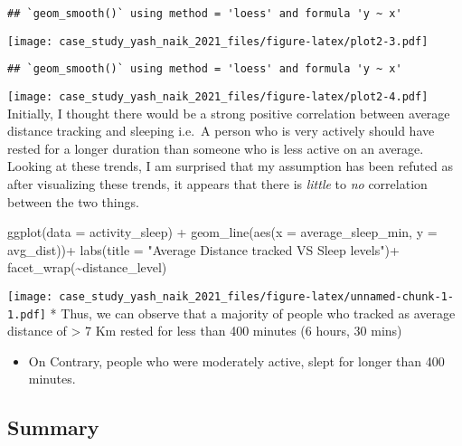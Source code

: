\documentclass[
]{article}
\newenvironment{Shaded}{\begin{snugshade}}{\end{snugshade}}
\newcommand{\AttributeTok}[1]{\textcolor[rgb]{0.77,0.63,0.00}{#1}}
\newcommand{\FunctionTok}[1]{\textcolor[rgb]{0.00,0.00,0.00}{#1}}
\newcommand{\NormalTok}[1]{#1}
\newcommand{\SpecialCharTok}[1]{\textcolor[rgb]{0.00,0.00,0.00}{#1}}
\newcommand{\StringTok}[1]{\textcolor[rgb]{0.31,0.60,0.02}{#1}}
\providecommand{\tightlist}{%
  \setlength{\itemsep}{0pt}\setlength{\parskip}{0pt}}
\begin{document}
\begin{verbatim}
## `geom_smooth()` using method = 'loess' and formula 'y ~ x'
\end{verbatim}

\texttt{[image: case\_study\_yash\_naik\_2021\_files/figure-latex/plot2-3.pdf]}

\begin{verbatim}
## `geom_smooth()` using method = 'loess' and formula 'y ~ x'
\end{verbatim}

\texttt{[image: case\_study\_yash\_naik\_2021\_files/figure-latex/plot2-4.pdf]}
Initially, I thought there would be a strong positive correlation
between average distance tracking and sleeping i.e.~A person who is very
actively should have rested for a longer duration than someone who is
less active on an average. Looking at these trends, I am surprised that
my assumption has been refuted as after visualizing these trends, it
appears that there is \emph{little} to \emph{no} correlation between the
two things.

\begin{Shaded}
\begin{Highlighting}[]
\FunctionTok{ggplot}\NormalTok{(}\AttributeTok{data =}\NormalTok{ activity\_sleep) }\SpecialCharTok{+} \FunctionTok{geom\_line}\NormalTok{(}\FunctionTok{aes}\NormalTok{(}\AttributeTok{x =}\NormalTok{ average\_sleep\_min, }\AttributeTok{y =}\NormalTok{ avg\_dist))}\SpecialCharTok{+}
  \FunctionTok{labs}\NormalTok{(}\AttributeTok{title =} \StringTok{"Average Distance tracked VS Sleep levels"}\NormalTok{)}\SpecialCharTok{+}
  \FunctionTok{facet\_wrap}\NormalTok{(}\SpecialCharTok{\textasciitilde{}}\NormalTok{distance\_level)}
\end{Highlighting}
\end{Shaded}

\texttt{[image: case\_study\_yash\_naik\_2021\_files/figure-latex/unnamed-chunk-1-1.pdf]}
* Thus, we can observe that a majority of people who tracked as average
distance of \textgreater{} 7 Km rested for less than 400 minutes (6
hours, 30 mins)

\begin{itemize}
\tightlist
\item
  On Contrary, people who were moderately active, slept for longer than
  400 minutes.
\end{itemize}

\hypertarget{summary}{%
\subsection{Summary}\label{summary}}
\end{document}
